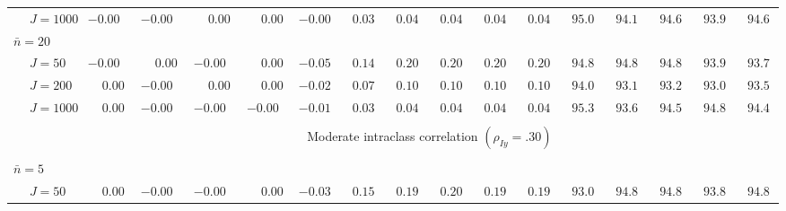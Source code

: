 \begin{sidewaystable}
\begin{threeparttable}
\begin{tabular}{llccccccccccccccc}
 & \nopagebreak $\;J=1000$  & ${-}0.00\phantom{0}$ & ${-}0.00\phantom{0}$ & $\phantom{-}0.00\phantom{0}$ & $\phantom{-}0.00\phantom{0}$ & ${-}0.00\phantom{0}$ & $\phantom{0}0.03\phantom{0}$ & $\phantom{0}0.04\phantom{0}$ & $\phantom{0}0.04\phantom{0}$ & $\phantom{0}0.04\phantom{0}$ & $\phantom{0}0.04\phantom{0}$ & $\phantom{0}95.0\phantom{0}$ & $\phantom{0}94.1\phantom{0}$ & $\phantom{0}94.6\phantom{0}$ & $\phantom{0}93.9\phantom{0}$ & $\phantom{0}94.6\phantom{0}$ \\
\multicolumn{4}{l}{$\bar{n}=20$} \\  & \nopagebreak $\;J=50$  & ${-}0.00\phantom{0}$ & $\phantom{-}0.00\phantom{0}$ & ${-}0.00\phantom{0}$ & $\phantom{-}0.00\phantom{0}$ & ${-}0.05\phantom{0}$ & $\phantom{0}0.14\phantom{0}$ & $\phantom{0}0.20\phantom{0}$ & $\phantom{0}0.20\phantom{0}$ & $\phantom{0}0.20\phantom{0}$ & $\phantom{0}0.20\phantom{0}$ & $\phantom{0}94.8\phantom{0}$ & $\phantom{0}94.8\phantom{0}$ & $\phantom{0}94.8\phantom{0}$ & $\phantom{0}93.9\phantom{0}$ & $\phantom{0}93.7\phantom{0}$ \\
 & \nopagebreak $\;J=200$  & $\phantom{-}0.00\phantom{0}$ & ${-}0.00\phantom{0}$ & $\phantom{-}0.00\phantom{0}$ & $\phantom{-}0.00\phantom{0}$ & ${-}0.02\phantom{0}$ & $\phantom{0}0.07\phantom{0}$ & $\phantom{0}0.10\phantom{0}$ & $\phantom{0}0.10\phantom{0}$ & $\phantom{0}0.10\phantom{0}$ & $\phantom{0}0.10\phantom{0}$ & $\phantom{0}94.0\phantom{0}$ & $\phantom{0}93.1\phantom{0}$ & $\phantom{0}93.2\phantom{0}$ & $\phantom{0}93.0\phantom{0}$ & $\phantom{0}93.5\phantom{0}$ \\
 & \nopagebreak $\;J=1000$  & $\phantom{-}0.00\phantom{0}$ & ${-}0.00\phantom{0}$ & ${-}0.00\phantom{0}$ & ${-}0.00\phantom{0}$ & ${-}0.01\phantom{0}$ & $\phantom{0}0.03\phantom{0}$ & $\phantom{0}0.04\phantom{0}$ & $\phantom{0}0.04\phantom{0}$ & $\phantom{0}0.04\phantom{0}$ & $\phantom{0}0.04\phantom{0}$ & $\phantom{0}95.3\phantom{0}$ & $\phantom{0}93.6\phantom{0}$ & $\phantom{0}94.5\phantom{0}$ & $\phantom{0}94.8\phantom{0}$ & $\phantom{0}94.4\phantom{0}$ \\
[0.5ex]\hline\\[-1.6ex] 
& & \multicolumn{15}{c}{Moderate intraclass correlation $(\rho_{Iy}=.30)$} \\[0.6ex]\hline\\[-1.8ex]
\multicolumn{4}{l}{$\bar{n}=5$} \\  & \nopagebreak $\;J=50$  & $\phantom{-}0.00\phantom{0}$ & ${-}0.00\phantom{0}$ & ${-}0.00\phantom{0}$ & $\phantom{-}0.00\phantom{0}$ & ${-}0.03\phantom{0}$ & $\phantom{0}0.15\phantom{0}$ & $\phantom{0}0.19\phantom{0}$ & $\phantom{0}0.20\phantom{0}$ & $\phantom{0}0.19\phantom{0}$ & $\phantom{0}0.19\phantom{0}$ & $\phantom{0}93.0\phantom{0}$ & $\phantom{0}94.8\phantom{0}$ & $\phantom{0}94.8\phantom{0}$ & $\phantom{0}93.8\phantom{0}$ & $\phantom{0}94.8\phantom{0}$ \\

\end{tabular}
\end{threeparttable}
\end{sidewaystable}
